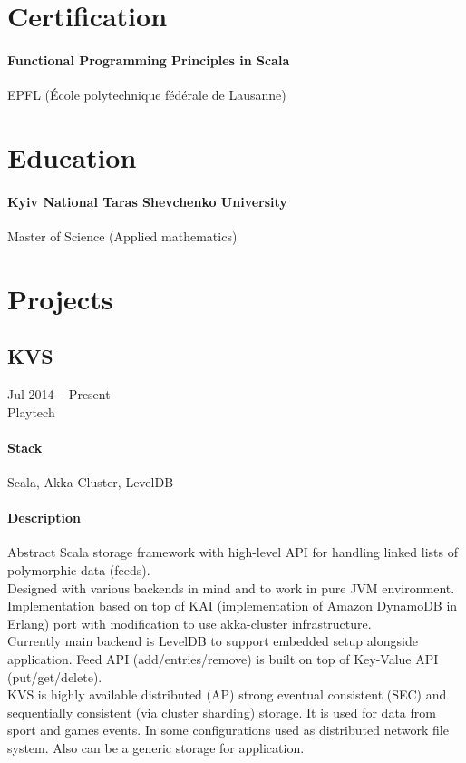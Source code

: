 \section{Certification}
\paragraph{Functional Programming Principles in Scala}
EPFL (École polytechnique fédérale de Lausanne)

\section{Education}
\paragraph{Kyiv National Taras Shevchenko University}
Master of Science (Applied mathematics)

\section{Projects}
\subsection{KVS}
Jul 2014 – Present\\
Playtech\\
\paragraph{Stack} Scala, Akka Cluster, LevelDB
\paragraph{Description}
Abstract Scala storage framework with high-level API for handling linked lists of polymorphic data (feeds).\\
Designed with various backends in mind and to work in pure JVM environment. Implementation based on top of KAI (implementation of Amazon DynamoDB in Erlang) port with modification to use akka-cluster infrastructure.\\
Currently main backend is LevelDB to support embedded setup alongside application. Feed API (add/entries/remove) is built on top of Key-Value API (put/get/delete).\\
KVS is highly available distributed (AP) strong eventual consistent (SEC) and sequentially consistent (via cluster sharding) storage. It is used for data from sport and games events. In some configurations used as distributed network file system. Also can be a generic storage for application.

